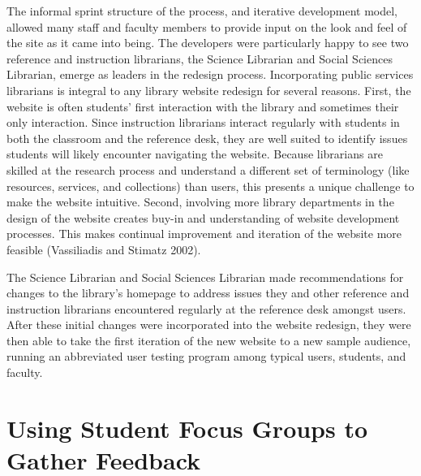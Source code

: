 \documentclass{book}
\begin{document}
The informal sprint structure of the process, and iterative development model,
allowed many staff and faculty members to provide input on the look and feel
of the site as it came into being. The developers were particularly happy to
see two reference and instruction librarians, the Science Librarian and Social
Sciences Librarian, emerge as leaders in the redesign process. Incorporating
public services librarians is integral to any library website redesign for
several reasons. First, the website is often students' first interaction with
the library and sometimes their only interaction. Since instruction librarians
interact regularly with students in both the classroom and the reference desk,
they are well suited to identify issues students will likely encounter
navigating the website. Because librarians are skilled at the research process
and understand a different set of terminology (like resources, services, and
collections) than users, this presents a unique challenge to make the website
intuitive. Second, involving more library departments in the design of the
website creates buy-in and understanding of website development processes.
This makes continual improvement and iteration of the website more feasible
(Vassiliadis and Stimatz 2002).

The Science Librarian and Social Sciences Librarian made recommendations for
changes to the library's homepage to address issues they and other reference
and instruction librarians encountered regularly at the reference desk amongst
users. After these initial changes were incorporated into the website
redesign, they were then able to take the first iteration of the new website
to a new sample audience, running an abbreviated user testing program among
typical users, students, and faculty.

\hypertarget{using-student-focus-groups-to-gather-feedback}{%
\section{Using Student Focus Groups to Gather
Feedback}\label{using-student-focus-groups-to-gather-feedback}}
\end{document}
